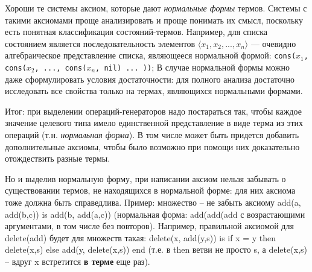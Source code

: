 Хороши те системы аксиом, которые дают \emph{нормальные формы} термов. Системы с такими аксиомами проще анализировать и проще понимать их смысл, поскольку есть понятная классификация состояний-термов. Например, для списка состоянием является последовательность элементов $\langle x_1, x_2, ..., x_n \rangle$ --- очевидно алгебраическое представление списка, являющееся нормальной формой: \texttt{cons($x_1$, cons($x_2$, ..., cons($x_n$, nil) ... ))}; В случае нормальной формы можно даже сформулировать условия достаточности: для полного анализа достаточно исследовать все свойства только на термах, являющихся нормальными формами.

Итог: при выделении операций-генераторов надо постараться так, чтобы каждое значение целевого типа имело единственной представление в виде терма из этих операций (т.н. \emph{нормальная форма}). В том числе может быть придется добавить дополнительные аксиомы, чтобы было возможно при помощи них доказательно отождествить разные термы.

Но и выделив нормальную форму, при написании аксиом нельзя забывать о существовании термов, не находящихся в нормальной форме: для них аксиома тоже должна быть справедлива. Пример: множество -- не забыть аксиому add(a, add(b,c)) is add(b, add(a,c))   (нормальная форма: add(add(add с возрастающими аргументами, в том числе без повторов). Например, правильной аксиомой для delete(add) будет для множеств такая: delete(x, add(y,s)) is if x = y then delete(x,s) else add(y, delete(x,s)) end (т.е. в then ветви не просто s, а delete(x,s) -- вдруг x встретится \textbf{в терме} еще раз).

